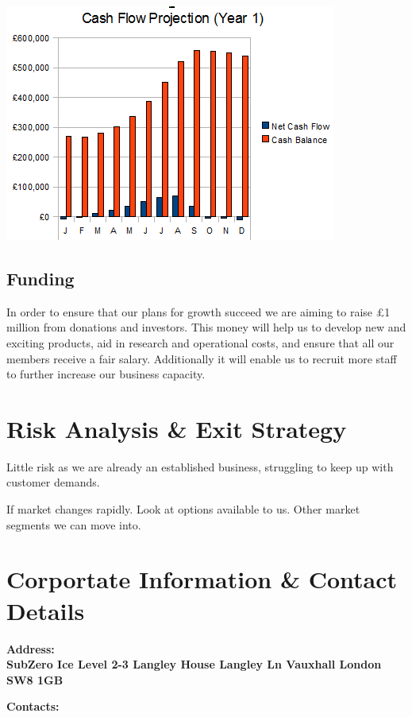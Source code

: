 \documentclass{article}
\begin{document}
\includegraphics[scale=1.0]{cashFlowYear1.png}

\subsection{Funding}

In order to ensure that our plans for growth succeed we are aiming to raise £1 million from donations and investors. This money will help us to develop new and exciting products, aid in research and operational costs, and ensure that all our members receive a fair salary. Additionally it will enable us to recruit more staff to further increase our business capacity.

\section{Risk Analysis \& Exit Strategy}


Little risk as we are already an established business, struggling to keep up with customer demands.

If market changes rapidly. Look at options available to us. Other market segments we can move into.



\section{Corportate Information \& Contact Details}

\bf{Address:} \\

SubZero Ice
Level 2-3 
Langley House
Langley Ln
Vauxhall
London
SW8 1GB

\bf{Contacts:} \\
\end{document}
